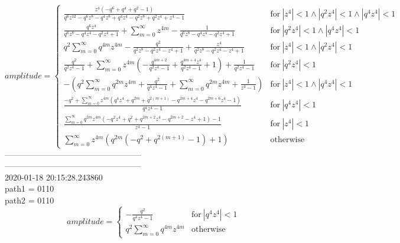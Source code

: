 $$amplitude = \begin{cases} \frac{z^{4} \left(- q^{6} + q^{4} + q^{2} - 1\right)}{q^{6} z^{12} - q^{6} z^{8} - q^{4} z^{8} + q^{4} z^{4} - q^{2} z^{8} + q^{2} z^{4} + z^{4} - 1} & \text{for}\: \left|{z^{4}}\right| < 1 \wedge \left|{q^{2} z^{4}}\right| < 1 \wedge \left|{q^{4} z^{4}}\right| < 1 \\\frac{q^{6} z^{4}}{q^{6} z^{8} - q^{4} z^{4} - q^{2} z^{4} + 1} + \sum_{m=0}^{\infty} z^{4 m} - \frac{1}{q^{6} z^{8} - q^{4} z^{4} - q^{2} z^{4} + 1} & \text{for}\: \left|{q^{2} z^{4}}\right| < 1 \wedge \left|{q^{4} z^{4}}\right| < 1 \\q^{2} \sum_{m=0}^{\infty} q^{4 m} z^{4 m} - \frac{q^{2}}{q^{2} z^{8} - q^{2} z^{4} - z^{4} + 1} + \frac{z^{4}}{q^{2} z^{8} - q^{2} z^{4} - z^{4} + 1} & \text{for}\: \left|{z^{4}}\right| < 1 \wedge \left|{q^{2} z^{4}}\right| < 1 \\\frac{q^{2}}{q^{2} z^{4} - 1} + \sum_{m=0}^{\infty} z^{4 m} \left(- \frac{q^{4 m + 2}}{q^{2} z^{4} - 1} + \frac{q^{4 m + 4} z^{4}}{q^{2} z^{4} - 1} + 1\right) + \frac{1}{q^{2} z^{4} - 1} & \text{for}\: \left|{q^{2} z^{4}}\right| < 1 \\- (q^{2} \sum_{m=0}^{\infty} q^{2 m} z^{4 m} + \frac{q^{2}}{q^{4} z^{4} - 1} + \sum_{m=0}^{\infty} q^{2 m} z^{4 m} + \frac{1}{z^{4} - 1}) & \text{for}\: \left|{z^{4}}\right| < 1 \wedge \left|{q^{4} z^{4}}\right| < 1 \\\frac{- q^{2} + \sum_{m=0}^{\infty} z^{4 m} \left(q^{4} z^{4} + q^{2 m} + q^{2 \left(m + 1\right)} - q^{2 m + 4} z^{4} - q^{2 m + 6} z^{4} - 1\right)}{q^{4} z^{4} - 1} & \text{for}\: \left|{q^{4} z^{4}}\right| < 1 \\\frac{\sum_{m=0}^{\infty} q^{2 m} z^{4 m} \left(- q^{2} z^{4} + q^{2} + q^{2 m + 2} z^{4} - q^{2 m + 2} - z^{4} + 1\right) - 1}{z^{4} - 1} & \text{for}\: \left|{z^{4}}\right| < 1 \\\sum_{m=0}^{\infty} z^{4 m} \left(q^{2 m} \left(- q^{2} + q^{2 \left(m + 1\right)} - 1\right) + 1\right) & \text{otherwise} \end{cases}$$
--------------------------------------------------\\
--------------------------------------------------\\
2020-01-18 20:15:28.243860\\
path1 = 0110\\
path2 = 0110\\
$$amplitude = \begin{cases} - \frac{q^{2}}{q^{4} z^{4} - 1} & \text{for}\: \left|{q^{4} z^{4}}\right| < 1 \\q^{2} \sum_{m=0}^{\infty} q^{4 m} z^{4 m} & \text{otherwise} \end{cases}$$
